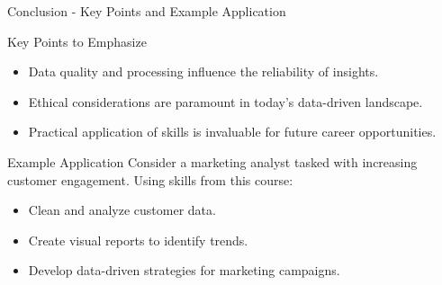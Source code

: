 \documentclass[aspectratio=169]{beamer}
\begin{document}
\begin{frame}[fragile]{Conclusion - Key Points and Example Application}
  \begin{block}{Key Points to Emphasize}
    \begin{itemize}
      \item Data quality and processing influence the reliability of insights.
      \item Ethical considerations are paramount in today's data-driven landscape.
      \item Practical application of skills is invaluable for future career opportunities.
    \end{itemize}
  \end{block}

  \begin{block}{Example Application}
    Consider a marketing analyst tasked with increasing customer engagement. Using skills from this course:
    \begin{itemize}
      \item Clean and analyze customer data.
      \item Create visual reports to identify trends.
      \item Develop data-driven strategies for marketing campaigns.
    \end{itemize}
  \end{block}
\end{frame}
\end{document}
